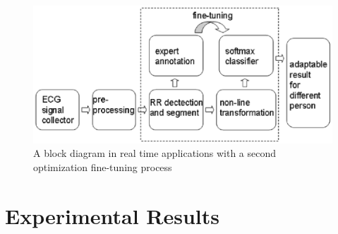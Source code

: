 \documentclass[journal]{IEEEtran}
\begin{document}


\begin{figure}[tbp]
\centering
\includegraphics[width=3.2 in]{eps/chart.eps}
\caption{A block diagram in real time applications with a second optimization fine-tuning process}
\label{chart}
\end{figure}



\section{Experimental Results}
\end{document}
